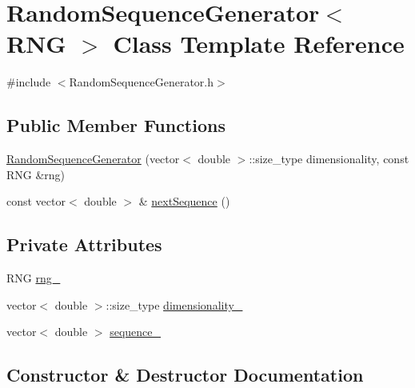 \hypertarget{class_random_sequence_generator}{}\section{Random\+Sequence\+Generator$<$ R\+NG $>$ Class Template Reference}
\label{class_random_sequence_generator}


{\ttfamily \#include $<$Random\+Sequence\+Generator.\+h$>$}

\subsection*{Public Member Functions}
\begin{DoxyCompactItemize}
\item 
\hyperlink{class_random_sequence_generator_a148644138c29dae6ebe57657c8ca2cce}{Random\+Sequence\+Generator} (vector$<$ double $>$\+::size\+\_\+type dimensionality, const R\+NG \&rng)
\item 
const vector$<$ double $>$ \& \hyperlink{class_random_sequence_generator_a63f2d6fdb7f7bab6cdf3506f91cc814c}{next\+Sequence} ()
\end{DoxyCompactItemize}
\subsection*{Private Attributes}
\begin{DoxyCompactItemize}
\item 
R\+NG \hyperlink{class_random_sequence_generator_a8a7cbf03d0e0e50f2d4bf571a6654228}{rng\+\_\+}
\item 
vector$<$ double $>$\+::size\+\_\+type \hyperlink{class_random_sequence_generator_af950ba4e5e31b62b03997742d1e542ce}{dimensionality\+\_\+}
\item 
vector$<$ double $>$ \hyperlink{class_random_sequence_generator_a876cc58b9aa9d48e6a068567356eb6f0}{sequence\+\_\+}
\end{DoxyCompactItemize}


\subsection{Constructor \& Destructor Documentation}
\hypertarget{class_random_sequence_generator_a148644138c29dae6ebe57657c8ca2cce}{}\label{class_random_sequence_generator_a148644138c29dae6ebe57657c8ca2cce} 
